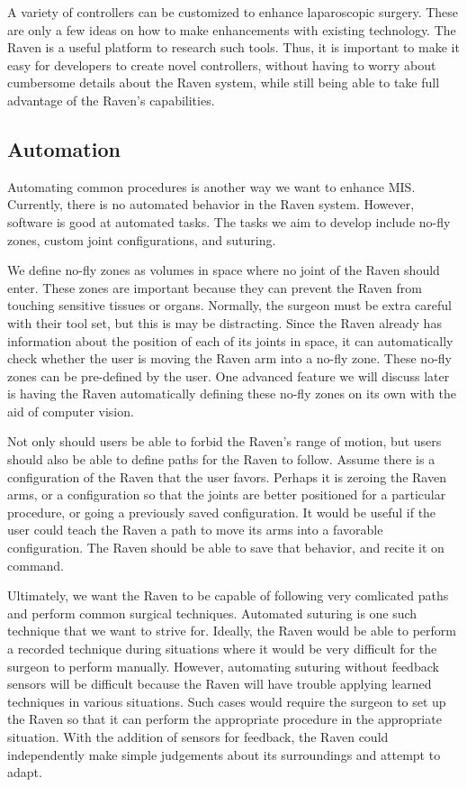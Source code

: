 \documentclass[letterpaper,twocolumn,10pt]{article}
\begin{document}
A variety of controllers can be customized to enhance laparoscopic
surgery. These are only a few ideas on how to make enhancements with
existing technology. The Raven is a useful platform to research such
tools. Thus, it is important to make it easy for developers to create
novel controllers, without having to worry about cumbersome details
about the Raven system, while still being able to take full advantage
of the Raven's capabilities.

\subsection{Automation}
Automating common procedures is another way we want to enhance MIS.
Currently, there is no automated behavior in the Raven system. However, 
software is good at automated tasks. The tasks we aim to  
develop include no-fly zones, custom joint configurations, and 
suturing.

We define no-fly zones as volumes in space where no joint of the Raven 
should enter. These zones are important because they can prevent the 
Raven from touching sensitive tissues or organs. Normally, the surgeon 
must be extra careful with their tool set, but this is may be 
distracting. Since the Raven already has information about 
the position of each of its joints in space, it can automatically 
check whether the user is moving the Raven arm into a no-fly zone. 
These no-fly zones can be pre-defined by the user. One advanced 
feature we will discuss later is having the Raven automatically defining 
these no-fly zones on its own with the aid of computer vision.

Not only should users be able to forbid the Raven's range of motion, 
but users should also be able to define 
paths for the Raven to follow. Assume there is a configuration of 
the Raven that the user favors. Perhaps it is zeroing the Raven arms, 
or a configuration so that the joints are better positioned for a 
particular procedure, or going a previously saved configuration. 
It would be useful if the user could teach the Raven a path to move 
its arms into a favorable configuration. The Raven should be able to 
save that behavior, and recite it on command.

Ultimately, we want the Raven to be capable of following very 
comlicated paths and perform common surgical techniques. Automated 
suturing is one such technique that we want to strive for. Ideally, 
the Raven would be able to perform a recorded technique  
during situations where it would be very difficult 
for the surgeon to perform manually. However, automating suturing 
without feedback sensors will be difficult because the Raven will 
have trouble applying learned techniques in various situations. 
Such cases would require the surgeon to set up the Raven so that it can 
perform the appropriate procedure in the appropriate situation. With 
the addition of sensors for feedback, the Raven could independently make 
simple judgements about its surroundings and attempt to adapt.
\end{document}
